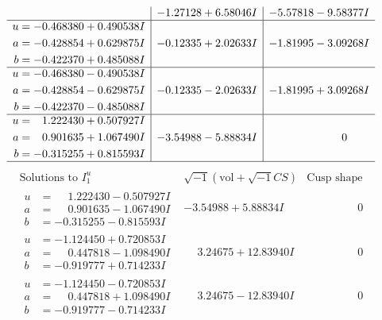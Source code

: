 \documentclass[1p]{elsarticle_modified}
\theoremstyle{definition}
\newcommand{\I}{\sqrt{-1}}
\begin{document}
$$\begin{array}{c|c|c}
 & -1.27128 + 6.58046 I & -5.57818 - 9.58377 I \\ \hline\begin{aligned}
u &= -0.468380 + 0.490538 I \\
a &= -0.428854 + 0.629875 I \\
b &= -0.422370 + 0.485088 I\end{aligned}
 & -0.12335 + 2.02633 I & -1.81995 - 3.09268 I \\ \hline\begin{aligned}
u &= -0.468380 - 0.490538 I \\
a &= -0.428854 - 0.629875 I \\
b &= -0.422370 - 0.485088 I\end{aligned}
 & -0.12335 - 2.02633 I & -1.81995 + 3.09268 I \\ \hline\begin{aligned}
u &= \phantom{-}1.222430 + 0.507927 I \\
a &= \phantom{-}0.901635 + 1.067490 I \\
b &= -0.315255 + 0.815593 I\end{aligned}
 & -3.54988 - 5.88834 I & \phantom{-0.000000 } 0\\
 \hline 
 \end{array}$$\newpage$$\begin{array}{c|c|c}  
\text{Solutions to }I^u_{1}& \I (\text{vol} + \sqrt{-1}CS) & \text{Cusp shape}\\
 \hline 
\begin{aligned}
u &= \phantom{-}1.222430 - 0.507927 I \\
a &= \phantom{-}0.901635 - 1.067490 I \\
b &= -0.315255 - 0.815593 I\end{aligned}
 & -3.54988 + 5.88834 I & \phantom{-0.000000 } 0 \\ \hline\begin{aligned}
u &= -1.124450 + 0.720853 I \\
a &= \phantom{-}0.447818 - 1.098490 I \\
b &= -0.919777 + 0.714233 I\end{aligned}
 & \phantom{-}3.24675 + 12.83940 I & \phantom{-0.000000 } 0 \\ \hline\begin{aligned}
u &= -1.124450 - 0.720853 I \\
a &= \phantom{-}0.447818 + 1.098490 I \\
b &= -0.919777 - 0.714233 I\end{aligned}
 & \phantom{-}3.24675 - 12.83940 I & \phantom{-0.000000 } 0 \\ \hline\begin{aligned}

\end{aligned}
\end{array}$$
\end{document}
